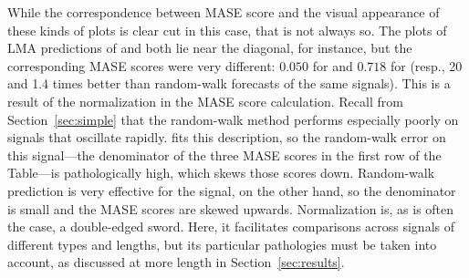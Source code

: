 While the correspondence between MASE score and the visual appearance
of these kinds of plots is clear cut in this case, that is not always
so.  The plots of LMA predictions of \col and \svdfive both lie near
the diagonal, for instance, but the corresponding MASE scores were
very different: $0.050$ for \col and $0.718$ for \svdfive (resp., 20
and 1.4 times better than random-walk forecasts of the same signals).
This is a result of the normalization in the MASE score calculation.
Recall from Section~\ref{sec:simple} that the random-walk method
performs especially poorly on signals that oscillate rapidly.  \col
fits this description, so the random-walk error on this signal---the
denominator of the three MASE scores in the first row of the
Table---is pathologically high, which skews those scores down.
Random-walk prediction is very effective for the \svdfive signal, on
the other hand, so the denominator is small and the MASE scores are
skewed upwards.  Normalization is, as is often the case, a
double-edged sword.  Here, it facilitates comparisons across signals
of different types and lengths, but its particular pathologies must be
taken into account, as discussed at more length in
Section~\ref{sec:results}.




